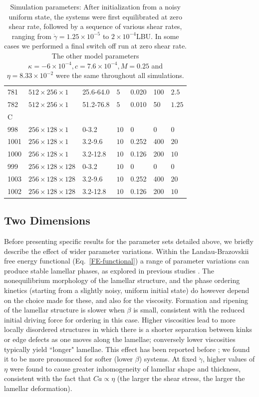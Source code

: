 \documentclass[8.5pt,twoside,twocolumn]{article}
\begin{document}
\begin{table}[htp]
\begin{tabular*}{0.52\textwidth}{l|l|l|l|l|l|l}
781 & $512\times256\times1$ & 25.6-64.0& $5$ &0.020 & 100 &  $2.5$ \\
782 & $512\times256\times1$ & 51.2-76.8& $5$ &0.010 & 50 &  $1.25$ \\
\hline
C & & & & & &\\
\hline
998 & $256\times128\times1$ & 0-3.2& $10$ &0 & 0 & 0 \\
1001 & $256\times128\times1$ & 3.2-9.6& $10$ &0.252 & 400 &  $20$ \\
1000 & $256\times128\times1$ & 3.2-12.8& $10$ &0.126 & 200 &  $10$ \\
\hline
999 & $256\times128\times128$ & 0-3.2 & $10$ &0 & 0 &  0 \\
1003 & $256\times128\times128$ & 3.2-9.6 & $10$ &0.252 & 400 &  $20$\\
1002 & $256\times128\times128$ & 3.2-12.8 & $10$ &0.126 & 200 &  $10$\\
\hline
\end{tabular*}

\caption{Simulation parameters: After initialization from a noisy uniform state, the systems were first equilibrated at zero shear rate, followed by a sequence of various shear rates, ranging from $\dot{\gamma}=1.25\times10^{-5}$ to $2\times10^{-4}$LBU. In some cases we performed a final switch off run at zero shear rate. The other model parameters $\kappa=-6\times10^{-4}, c=7.6\times10^{-4}, M=0.25$ and $\eta=8.33\times10^{-2}$ were the same throughout all simulations.}
\label{tab1}
\end{table}

\subsection{Two Dimensions}

\label{results2D}
Before presenting specific results for the parameter sets detailed above, we briefly describe the effect of wider parameter variations.
Within the Landau-Brazovskii free energy functional (Eq.~\ref{FE-functional}) a range of parameter variations can produce stable lamellar phases, as explored in previous studies \cite{Kendon01,Kumaran2001,Xu03, Xu06b,Kumaran2011}.
The nonequilibrium morphology of the lamellar structure, and the phase ordering kinetics (starting from a slightly noisy, uniform initial state) do however depend on the choice made for these, and also for the viscosity. 
Formation and ripening of the lamellar structure is slower when $\beta$ is small, consistent with the reduced initial driving force for ordering in this case. Higher viscosities lead to more locally disordered structures in which there is a shorter separation between kinks or edge defects as one moves along the lamellae; conversely lower viscosities typically yield ``longer" lamellae.
This effect has been reported before \cite{Gonnella97}; we found it to be more pronounced for softer (lower $\beta$) systems. At fixed $\dot\gamma$, higher values of $\eta$ were found to cause greater inhomogeneity of lamellar shape and thickness, consistent with the fact that $Ca\propto\eta$ (the larger the shear stress, the larger the lamellar deformation). 
\end{document}
